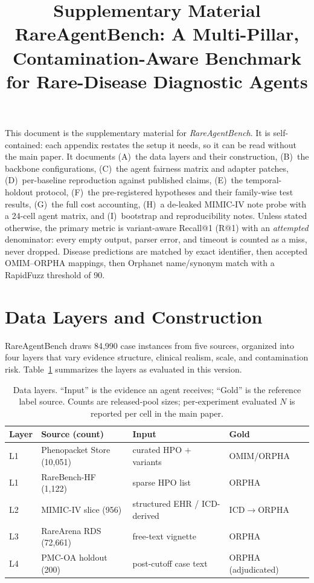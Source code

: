 \documentclass[letterpaper]{article} %
\title{Supplementary Material\\
RareAgentBench: A Multi-Pillar, Contamination-Aware Benchmark for Rare-Disease Diagnostic Agents}
\author{}
\begin{document}
\maketitle

\noindent
This document is the supplementary material for \emph{RareAgentBench}. It is
self-contained: each appendix restates the setup it needs, so it can be read
without the main paper. It documents (A)~the data layers and their construction,
(B)~the backbone configurations, (C)~the agent fairness matrix and adapter
patches, (D)~per-baseline reproduction against published claims,
(E)~the temporal-holdout protocol, (F)~the pre-registered hypotheses and their
family-wise test results, (G)~the full cost accounting, (H)~a de-leaked
MIMIC-IV note probe with a 24-cell agent matrix, and (I)~bootstrap and
reproducibility notes. Unless stated otherwise, the primary metric is
variant-aware Recall@1 (R@1) with an \emph{attempted} denominator: every empty
output, parser error, and timeout is counted as a miss, never dropped. Disease
predictions are matched by exact identifier, then accepted OMIM--ORPHA mappings,
then Orphanet name/synonym match with a RapidFuzz threshold of 90.

\section{Data Layers and Construction}
\label{app:data}

RareAgentBench draws 84,990 case instances from five sources, organized into
four layers that vary evidence structure, clinical realism, scale, and
contamination risk. Table~\ref{tab:datalayers} summarizes the layers as
evaluated in this version.

\begin{table}[h]
\centering
\scriptsize
\setlength{\tabcolsep}{3.5pt}
\caption{Data layers. ``Input'' is the evidence an agent receives; ``Gold'' is
the reference label source. Counts are released-pool sizes; per-experiment
evaluated $N$ is reported per cell in the main paper.}
\label{tab:datalayers}
\begin{tabular}{@{}llll@{}}
\toprule
Layer & Source (count) & Input & Gold \\
\midrule
L1 & Phenopacket Store (10,051) & curated HPO $+$ variants & OMIM/ORPHA \\
L1 & RareBench-HF (1,122) & sparse HPO list & ORPHA \\
L2 & MIMIC-IV slice (956) & structured EHR / ICD-derived & ICD$\rightarrow$ORPHA \\
L3 & RareArena RDS (72,661) & free-text vignette & ORPHA \\
L4 & PMC-OA holdout (200) & post-cutoff case text & ORPHA (adjudicated) \\
\bottomrule
\end{tabular}
\end{table}
\end{document}
